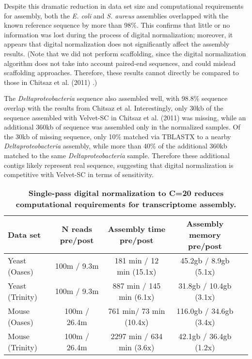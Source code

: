 %
Despite this dramatic reduction in data set size and computational requirements
for assembly, both the {\em E. coli} and {\em S. aureus} assemblies overlapped
with the known reference sequence by more than 98\%.  This confirms that little
or no information was lost during the process of digital normalization;
moreover, it appears that digital normalization does not significantly affect
the assembly results. (Note that we did not perform scaffolding, since the
digital normalization algorithm does not take into account paired-end
sequences, and could mislead scaffolding approaches.  Therefore, these results
cannot directly be compared to those in Chitsaz et al. (2011)
\cite{pubmed21926975}.)

The {\em Deltaproteobacteria} sequence also assembled well, with 98.8\%
sequence overlap with the results from Chitsaz et al. Interestingly, only 30kb
of the sequence assembled with Velvet-SC in Chitsaz et al. (2011) was missing,
while an additional 360kb of sequence was assembled only in the normalized
samples.  Of the 30kb of missing sequence, only 10\% matched via TBLASTX to a
nearby {\em Deltaproteobacteria} assembly, while more than 40\% of the
additional 360kb matched to the same {\em Deltaproteobacteria} sample.
Therefore these additional contigs likely represent real sequence, suggesting
that digital normalization is competitive with Velvet-SC in terms of
sensitivity.

% 


\begin{table}[!ht]
\centering
\resizebox{16cm}{!} {

\begin{tabular}{|l|c|c|c|c|}
 \hline 
Data set & N reads pre/post & Assembly time pre/post & Assembly memory pre/post \\
 \hline 
Yeast (Oases) & 100m / 9.3m & 181 min / 12 min (15.1x) & 45.2gb / 8.9gb (5.1x) \\
Yeast (Trinity) & 100m / 9.3m & 887 min / 145 min (6.1x) & 31.8gb / 10.4gb (3.1x) \\
Mouse (Oases) & 100m / 26.4m & 761 min/ 73 min (10.4x) & 116.0gb / 34.6gb (3.4x) \\
Mouse (Trinity) & 100m / 26.4m & 2297 min / 634 min (3.6x) & 42.1gb / 36.4gb (1.2x) \\
 \hline 
\end{tabular}
}
\caption{
\bf{Single-pass digital normalization to C=20 reduces computational
requirements for transcriptome assembly.}}

\label{tab:dntrans}
\end{table}


